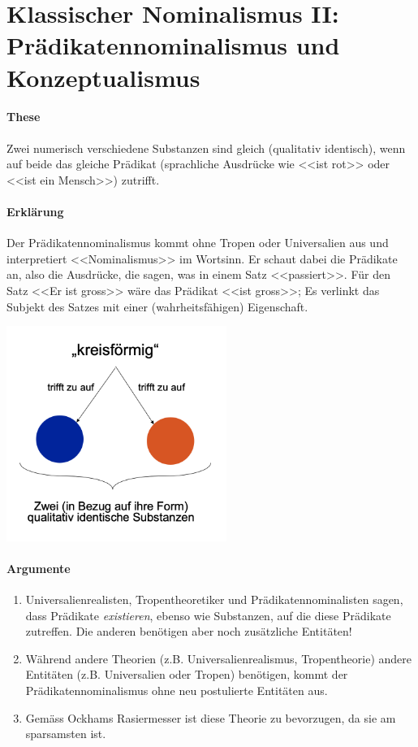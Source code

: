 \documentclass[../main.tex]{subfiles}
\begin{document}
\section{Klassischer Nominalismus II: Prädikatennominalismus und Konzeptualismus}
\paragraph{These} Zwei numerisch verschiedene Substanzen sind gleich (qualitativ identisch), wenn auf beide das gleiche Prädikat (sprachliche Ausdrücke wie <<ist rot>> oder <<ist ein Mensch>>) zutrifft.
\paragraph{Erklärung} Der Prädikatennominalismus kommt ohne Tropen oder Universalien aus und interpretiert <<Nominalismus>> im Wortsinn. Er schaut dabei die Prädikate an, also die Ausdrücke, die sagen, was in einem Satz <<passiert>>. Für den Satz <<Er ist gross>> wäre das Prädikat <<ist gross>>; Es verlinkt das Subjekt des Satzes mit einer (wahrheitsfähigen) Eigenschaft. 

\vspace{10pt}
{\centering\includegraphics[height=7cm]{images/praedikatennominalismus.png}\endcenter}

\paragraph{Argumente}
\begin{enumerate}
	\item Universalienrealisten, Tropentheoretiker und Prädikatennominalisten sagen, dass Prädikate \textit{existieren}, ebenso wie Substanzen, auf die diese Prädikate zutreffen. Die anderen benötigen aber noch zusätzliche Entitäten!
	\item Während andere Theorien (z.B. Universalienrealismus, Tropentheorie) andere Entitäten (z.B. Universalien oder Tropen) benötigen, kommt der Prädikatennominalismus ohne neu postulierte Entitäten aus.  
	\item Gemäss Ockhams Rasiermesser ist diese Theorie zu bevorzugen, da sie am sparsamsten ist. 
\end{enumerate}
\end{document}
